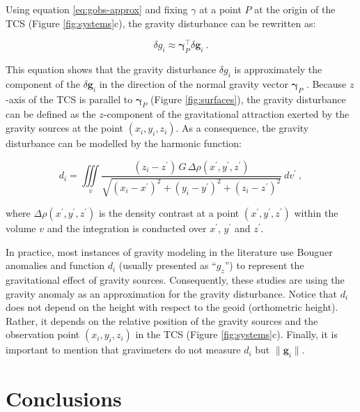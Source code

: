\documentclass[paper,twocolumn,twoside]{geophysics}
\begin{document}
Using equation \ref{eq:gobs-approx} and fixing $\gamma$ at a point $P$ at
the origin of the TCS (Figure \ref{fig:systems}c),
the gravity disturbance can be rewritten as:

\begin{equation}
\delta g_{i} \approx \mathbf{\gamma}_{P}^{\top} \delta \mathbf{g}_{i} \: .
\label{eq:gravity-disturbance-approx-TCS}
\end{equation}

\noindent
This equation shows that the gravity disturbance $\delta g_{i}$ is
approximately the component of the $\delta \mathbf{g}_{i}$ in the direction of
the normal gravity vector $\mathbf{\gamma}_P$
\citep{hofmann-wellenhof-moritz2005, sanso_sideris2013}.
Because $z$-axis of the TCS is parallel to $\mathbf{\gamma}_P$
(Figure \ref{fig:surfaces}), the gravity disturbance can be defined as the
$z$-component of the gravitational attraction exerted by the gravity sources at
the point $(x_{i}, y_{i}, z_{i})$.
As a consequence, the gravity disturbance can be modelled by the harmonic
function:

\begin{equation}
d_{i} = \iiint\limits_{v}
\frac{(z_{i} - z^{\prime}) \, G \, \Delta\rho(x^{\prime}, y^{\prime}, z^{\prime})}
{\sqrt{(x_{i} - x^{\prime})^{2} +
		(y_{i} - y^{\prime})^{2} + (z_{i} - z^{\prime})^{2}}} \: dv^{\prime} \: ,
\label{eq:gz-local}
\end{equation}

\noindent
where $\Delta\rho(x^{\prime}, y^{\prime}, z^{\prime})$
is the density contrast at a point $(x^{\prime}, y^{\prime}, z^{\prime})$
within the volume $v$ and the integration is conducted over $x^{\prime}$,
$y^{\prime}$ and $z^{\prime}$.

In practice, most instances of gravity modeling in the literature use Bouguer
anomalies and function $d_{i}$ (usually presented as ``$g_z$'') to represent
the gravitational effect of gravity sources.
Consequently, these studies are using the gravity
anomaly as an approximation for the gravity disturbance.
Notice that $d_{i}$ does not depend on the
height with respect to the geoid (orthometric height).
Rather, it depends on the relative position of the gravity sources and the
observation point $(x_{i}, y_{i}, z_{i})$ in the TCS (Figure \ref{fig:systems}c).
Finally, it is important to mention that gravimeters do not measure $d_{i}$ but
$\| \mathbf{g}_i \|$.


\section{Conclusions}
\end{document}
